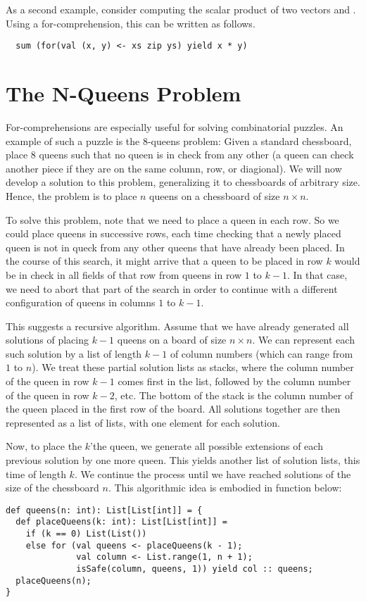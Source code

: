 \documentclass[a4paper,12pt,twoside,titlepage]{book}
\begin{document}
As a second example, consider computing the scalar product of two
vectors  and . Using a for-comprehension, this can
be written as follows.
\begin{lstlisting}
  sum (for(val (x, y) <- xs zip ys) yield x * y)
\end{lstlisting}

\section{The N-Queens Problem}

For-comprehensions are especially useful for solving combinatorial
puzzles. An example of such a puzzle is the 8-queens problem: Given a
standard chessboard, place 8 queens such that no queen is in check from any
other (a queen can check another piece if they are on the same
column, row, or diagional). We will now develop a solution to this
problem, generalizing it to chessboards of arbitrary size. Hence, the
problem is to place $n$ queens on a chessboard of size $n \times n$.

To solve this problem, note that we need to place a queen in each row.
So we could place queens in successive rows, each time checking that a
newly placed queen is not in queck from any other queens that have
already been placed. In the course of this search, it might arrive
that a queen to be placed in row $k$ would be in check in all fields
of that row from queens in row $1$ to $k-1$. In that case, we need to
abort that part of the search in order to continue with a different
configuration of queens in columns $1$ to $k-1$.

This suggests a recursive algorithm.  Assume that we have already
generated all solutions of placing $k-1$ queens on a board of size $n
\times n$. We can represent each such solution by a list of length
$k-1$ of column numbers (which can range from $1$ to $n$).  We treat
these partial solution lists as stacks, where the column number of the
queen in row $k-1$ comes first in the list, followed by the column
number of the queen in row $k-2$, etc. The bottom of the stack is the
column number of the queen placed in the first row of the board.  All
solutions together are then represented as a list of lists, with one
element for each solution.

Now, to place the $k$'the queen, we generate all possible extensions
of each previous solution by one more queen. This yields another list
of solution lists, this time of length $k$. We continue the process
until we have reached solutions of the size of the chessboard $n$.
This algorithmic idea is embodied in function  below:
\begin{lstlisting}
def queens(n: int): List[List[int]] = {
  def placeQueens(k: int): List[List[int]] =
    if (k == 0) List(List())
    else for (val queens <- placeQueens(k - 1);
              val column <- List.range(1, n + 1);
              isSafe(column, queens, 1)) yield col :: queens;
  placeQueens(n);
}
\end{lstlisting}
\end{document}
